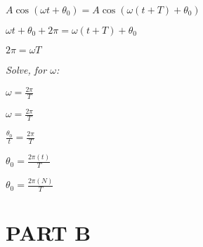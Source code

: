 \documentclass{article}
\begin{document}
\begin{center}
	$A\cos(\omega t + \theta_{0}) = A\cos(\omega(t+T)+\theta_0)
	$

$  \omega t + \theta_0 + 2\pi = \omega(t+T) + \theta_0
$

$  2\pi = \omega T
$
\end{center}
\textit{Solve, for $\omega$:}
\begin{center}
	$ \omega = \frac{2\pi}{T}
	$
\end{center}
\begin{center}
	$ \omega = \frac{2\pi}{T} 
$

	$ \frac{\theta_0}{t} = \frac{2\pi}{T}
	$

	$\theta_0 = \frac{2\pi(t)}{T}
	$
	
	$\theta_0 = \frac{2\pi(N)}{T}
	$
\end{center}
\section{PART B} 
\end{document}
